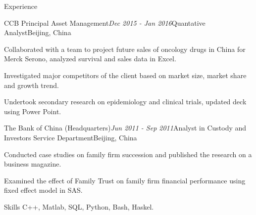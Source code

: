 \documentclass{resume} %
\begin{document}

\begin{rSection}{Experience}


\begin{rSubsection}{CCB Principal Asset Management}{\em Dec 2015 - Jan 2016}{Quantative Analyst}{Beijing, China}
\item Collaborated with a team to project future sales of oncology drugs in China for Merck Serono, analyzed survival and sales data in Excel.
\item Investigated major competitors of the client based on market size, market share and growth trend.
\item Undertook secondary research on epidemiology and clinical trials, updated deck using Power Point.

\end{rSubsection}


\begin{rSubsection}{The Bank of China (Headquarters)}{\em Jun 2011 - Sep 2011}{Analyst in Custody and Investors Service Department}{Beijing, China}
\item Conducted case studies on family firm succession and published the research on a business magazine.
\item Examined the effect of Family Trust on family firm financial performance using fixed effect model in SAS.  

\end{rSubsection}

\end{rSection}




\begin{rSection}{Skills}
C++, Matlab, SQL, Python, Bash, Haskel.

\end{rSection}


\end{document}
